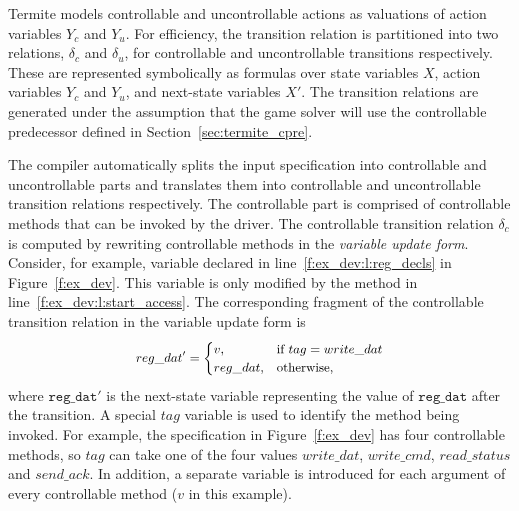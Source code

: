 Termite models controllable and uncontrollable actions as valuations of action variables $Y_c$ and $Y_u$.  For efficiency, the transition relation is partitioned into two relations, $\delta_c$ and $\delta_u$, for controllable and uncontrollable transitions respectively. These are represented symbolically as formulas over state variables $X$, action variables $Y_c$ and $Y_u$, and next-state variables $X'$. The transition relations are generated under the assumption that the game solver will use the controllable predecessor defined in Section~\ref{sec:termite_cpre}.

The \tsl compiler automatically splits the input specification into controllable and uncontrollable parts and translates them into controllable and uncontrollable transition relations respectively.  The controllable part is comprised of controllable methods that can be invoked by the driver.  The controllable transition relation $\delta_c$ is computed by rewriting controllable methods in the \emph{variable update form}.  Consider, for example, variable  declared in line~\ref{f:ex_dev:l:reg_decls} in Figure~\ref{f:ex_dev}.  This variable is only modified by the  method in line~\ref{f:ex_dev:l:start_access}. The corresponding fragment of the controllable transition relation in the variable update form is
$$
\small
\begin{aligned}
    &reg\_dat' = \begin{cases}
                     v       , & \text{if } tag=write\_dat \\
                     reg\_dat, & \text{otherwise},
                 \end{cases}\\
\end{aligned}
$$
where $\mathtt{reg\_dat'}$ is the next-state variable representing the value of $\mathtt{reg\_dat}$ after the transition. A special $tag$ variable is used to identify the method being invoked. For example, the specification in Figure~\ref{f:ex_dev} has four controllable methods, so $tag$ can take one of the four values $write\_dat$, $write\_cmd$, $read\_status$ and $send\_ack$.  In addition, a separate variable is introduced for each argument of every controllable method ($v$ in this example). 

